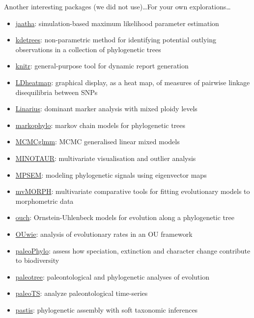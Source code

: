 \documentclass[compress, ucs, xelatex, 11pt, xcolor=svgnames,
  hyperref={
    bookmarks=true,
    unicode=true,
    colorlinks=true,
    pdftitle={Molecular data in R},
    plainpages=false,
    pdfauthor={Vojtech Zeisek},
    pdfsubject={Course about phylogeny and evolution in R},
    pdfcreator={XeLaTeX},
    pdfkeywords={R, evolution, phylogeny, molecular data},
    linkcolor=Tomato,
    anchorcolor=SaddleBrown,
    citecolor=Goldenrod,
    filecolor=DarkMagenta,
    menucolor=Sienna,
    urlcolor=DarkTurquoise,
    pdftex},
  url={hyphens, lowtilde} %
  ]{beamer}
\begin{document}
\begin{frame}[allowframebreaks]{Another interesting packages (we did not use)\ldots}{For your own explorations\ldots}
\begin{itemize}
    \item \href{https://cran.r-project.org/package=jaatha}{jaatha}: simulation-based maximum likelihood parameter estimation
    \item \href{https://cran.r-project.org/package=kdetrees}{kdetrees}: non-parametric method for identifying potential outlying observations in a collection of phylogenetic trees
    \item \href{https://cran.r-project.org/package=knitr}{knitr}: general-purpose tool for dynamic report generation
    \item \href{https://cran.r-project.org/package=LDheatmap}{LDheatmap}: graphical display, as a heat map, of measures of pairwise linkage disequilibria between SNPs
    \item \href{https://github.com/giby/Linarius}{Linarius}: dominant marker analysis with mixed ploidy levels
    \item \href{https://cran.r-project.org/package=markophylo}{markophylo}: markov chain models for phylogenetic trees
    \item \href{https://cran.r-project.org/package=MCMCglmm}{MCMCglmm}: MCMC generalised linear mixed models
    \item \href{https://github.com/NESCent/MINOTAUR}{MINOTAUR}: multivariate visualisation and outlier analysis
    \item \href{https://cran.r-project.org/package=MPSEM}{MPSEM}: modeling phylogenetic signals using eigenvector maps
    \item \href{https://cran.r-project.org/package=mvMORPH}{mvMORPH}: multivariate comparative tools for fitting evolutionary models to morphometric data
    \item \href{https://cran.r-project.org/package=ouch}{ouch}: Ornstein-Uhlenbeck models for evolution along a phylogenetic tree
    \item \href{https://cran.r-project.org/package=OUwie}{OUwie}: analysis of evolutionary rates in an OU framework
    \item \href{https://r-forge.r-project.org/projects/paleophylo/}{paleoPhylo}: assess how speciation, extinction and character change contribute to biodiversity
    \item \href{https://cran.r-project.org/package=paleotree}{paleotree}: paleontological and phylogenetic analyses of evolution
    \item \href{https://cran.r-project.org/package=paleoTS}{paleoTS}: analyze paleontological time-series
    \item \href{https://cran.r-project.org/package=pastis}{pastis}: phylogenetic assembly with soft taxonomic inferences

\end{itemize}
\end{frame}
\end{document}
